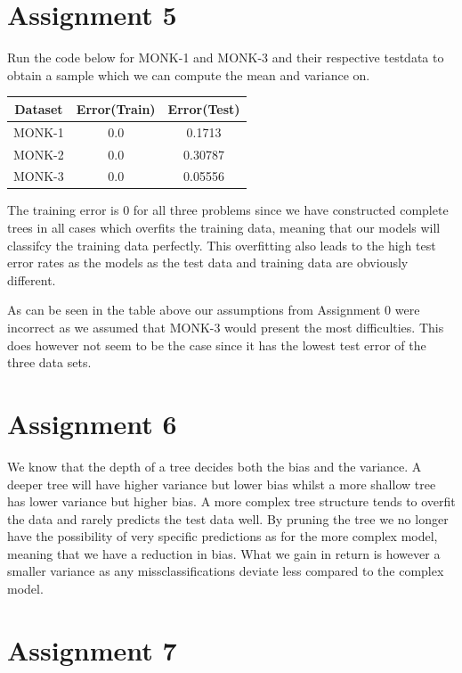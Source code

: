 \documentclass{article}
\begin{document}
\section*{Assignment 5}


Run the code below for MONK-1 and MONK-3 and their respective testdata to obtain a sample which we can 
compute the mean and variance on.

\begin{center}
 \begin{tabular}{|c | c | c |} 
 \hline
 Dataset & Error(Train) &  Error(Test) \\ [0.5ex] 
 \hline \hline
 MONK-1 & 0.0 & 0.1713 \\ 
 MONK-2 & 0.0 & 0.30787 \\ 
 MONK-3 & 0.0 & 0.05556  \\ [1ex] 
 \hline
\end{tabular}
\end{center}

The training error is $0$ for all three problems since we have constructed complete trees in all cases which overfits the training data, meaning that our models will classifcy the training data perfectly. This overfitting also leads to the high test error rates as the models as the test data and training data are obviously different. 

As can be seen in the table above our assumptions from Assignment 0 were incorrect as we assumed that MONK-3 would present the most difficulties. This does however not seem to be the case since it has the lowest test error of the three data sets. 


\section*{Assignment 6}

We know that the depth of a tree decides both the bias and the variance. A deeper tree will have higher variance but lower bias whilst a more shallow tree has lower variance but higher bias. A more complex tree structure tends to overfit the data and rarely predicts the test data well. By pruning the tree we no longer have the possibility of very specific predictions as for the more complex model, meaning that we have a reduction in bias. What we gain in return is however a smaller variance as any missclassifications deviate less compared to the complex model.

\section*{Assignment 7}
\end{document}
